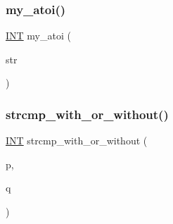 \mbox{\label{spreadsheet_8_c_a1ca6279102ce52b89b955c6470bb7a3c}} 
\subsubsection{\texorpdfstring{my\+\_\+atoi()}{my\_atoi()}}
{\footnotesize\ttfamily \mbox{\hyperlink{galois_8h_a09fddde158a3a20bd2dcadb609de11dc}{I\+NT}} my\+\_\+atoi (\begin{DoxyParamCaption}\item[{\mbox{\hyperlink{galois_8h_ab6cc7b4aeb6ea31aba2b3fbfc83ff5e6}{B\+Y\+TE}} $\ast$}]{str }\end{DoxyParamCaption})}

\mbox{\label{spreadsheet_8_c_a752bd7c2ce7c1dbd31fca65d0502be72}} 
\subsubsection{\texorpdfstring{strcmp\+\_\+with\+\_\+or\+\_\+without()}{strcmp\_with\_or\_without()}}
{\footnotesize\ttfamily \mbox{\hyperlink{galois_8h_a09fddde158a3a20bd2dcadb609de11dc}{I\+NT}} strcmp\+\_\+with\+\_\+or\+\_\+without (\begin{DoxyParamCaption}\item[{\mbox{\hyperlink{galois_8h_ab6cc7b4aeb6ea31aba2b3fbfc83ff5e6}{B\+Y\+TE}} $\ast$}]{p,  }\item[{\mbox{\hyperlink{galois_8h_ab6cc7b4aeb6ea31aba2b3fbfc83ff5e6}{B\+Y\+TE}} $\ast$}]{q }\end{DoxyParamCaption})}

